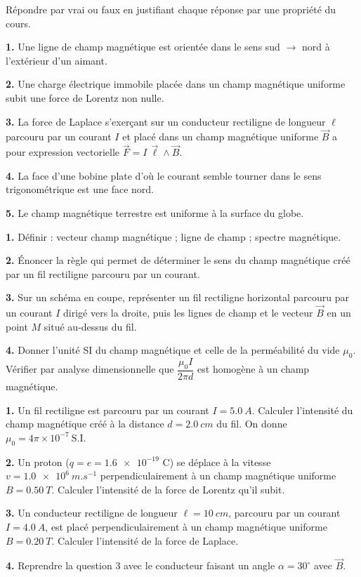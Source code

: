 \documentclass[11pt]{article}
\begin{document}
\begin{exercice}
Répondre par vrai ou faux en justifiant chaque réponse par une propriété du cours.

\textbf{1.} Une ligne de champ magnétique est orientée dans le sens sud $\rightarrow$ nord à l'extérieur d'un aimant.

\textbf{2.} Une charge électrique immobile placée dans un champ magnétique uniforme subit une force de Lorentz non nulle.

\textbf{3.} La force de Laplace s'exerçant sur un conducteur rectiligne de longueur $\ell$ parcouru par un courant $I$ et placé dans un champ magnétique uniforme $\vec{B}$ a pour expression vectorielle $\vec{F} = I\,\vec{\ell} \wedge \vec{B}$.

\textbf{4.} La face d'une bobine plate d'où le courant semble tourner dans le sens trigonométrique est une face nord.

\textbf{5.} Le champ magnétique terrestre est uniforme à la surface du globe.
\end{exercice}

\begin{exercice}
\textbf{1.} Définir : vecteur champ magnétique ; ligne de champ ; spectre magnétique.

\textbf{2.} Énoncer la règle qui permet de déterminer le sens du champ magnétique créé par un fil rectiligne parcouru par un courant.

\textbf{3.} Sur un schéma en coupe, représenter un fil rectiligne horizontal parcouru par un courant $I$ dirigé vers la droite, puis les lignes de champ et le vecteur $\vec{B}$ en un point $M$ situé au-dessus du fil.

\textbf{4.} Donner l'unité SI du champ magnétique et celle de la perméabilité du vide $\mu_0$. Vérifier par analyse dimensionnelle que $\dfrac{\mu_0 I}{2\pi d}$ est homogène à un champ magnétique.
\end{exercice}

\begin{exercice}
\textbf{1.} Un fil rectiligne est parcouru par un courant $I = \SI{5,0}{A}$. Calculer l'intensité du champ magnétique créé à la distance $d = \SI{2,0}{cm}$ du fil. On donne $\mu_0 = 4\pi \times 10^{-7}\ \mathrm{S.I.}$

\textbf{2.} Un proton ($q = e = \num{1,6e-19}$ C) se déplace à la vitesse $v = \SI{1,0e6}{m.s^{-1}}$ perpendiculairement à un champ magnétique uniforme $B = \SI{0,50}{T}$. Calculer l'intensité de la force de Lorentz qu'il subit.

\textbf{3.} Un conducteur rectiligne de longueur $\ell = \SI{10}{cm}$, parcouru par un courant $I = \SI{4,0}{A}$, est placé perpendiculairement à un champ magnétique uniforme $B = \SI{0,20}{T}$. Calculer l'intensité de la force de Laplace.

\textbf{4.} Reprendre la question 3 avec le conducteur faisant un angle $\alpha = 30^{\circ}$ avec $\vec{B}$.
\end{exercice}
\end{document}

